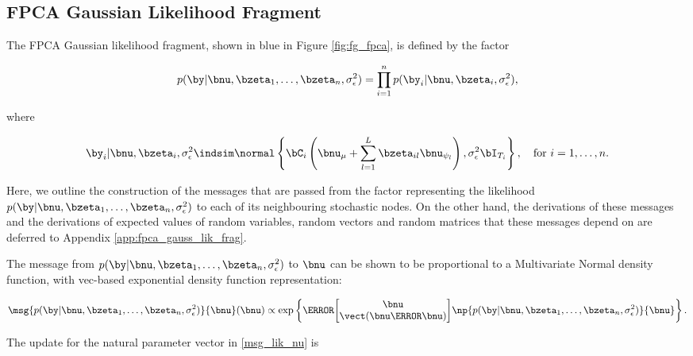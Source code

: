 \documentclass[12pt]{article}
\def\sigsqeps{\sigma^2_{\epsilon}}
\def\numu{\bnu_\mu}
\newcommand\nupsi[1]{\bnu_{\psi_{#1}}}
\theoremstyle{plain}
\theoremstyle{definition}
\theoremstyle{remark}
\begin{document}

\subsection{FPCA Gaussian Likelihood Fragment}
\label{sec:fpca_gauss_lik_frag}

The FPCA Gaussian likelihood fragment, shown in blue in Figure \ref{fig:fg_fpca}, is defined by the factor

\begin{equation}
	p (\by | \bnu, \bzeta_1, \dots, \bzeta_n, \sigsqeps) =
		\prod_{i=1}^n p (\by_i | \bnu, \bzeta_i, \sigsqeps),
\label{fpc_gauss_lik_factorized}
\end{equation}

\noindent where

\begin{equation}
	\by_i | \bnu, \bzeta_i, \sigsqeps \indsim \normal \left\{
		\bC_i \left( \numu + \sum_{l=1}^L \bzeta_{il} \nupsi{l} \right), \sigsqeps \bI_{T_i}
	\right\}, \quad \text{for $i = 1, \dots, n$}.
\label{fpc_gauss_lik_factor}
\end{equation}

\noindent Here, we outline the construction of the messages that are passed from the factor representing
the likelihood $p (\by | \bnu, \bzeta_1, \dots, \bzeta_n, \sigsqeps)$ to each of its neighbouring stochastic nodes.
On the other hand, the
derivations of these messages and the derivations of expected values of random variables, random vectors
and random matrices that these messages depend on are deferred to Appendix \ref{app:fpca_gauss_lik_frag}.

The message from $p (\by | \bnu, \bzeta_1, \dots, \bzeta_n, \sigsqeps)$ to $\bnu$ can be shown to be
proportional to a Multivariate
Normal density function, with vec-based exponential density function representation:

\begin{equation}
	\msg{p (\by | \bnu, \bzeta_1, \dots, \bzeta_n, \sigsqeps)}{\bnu} (\bnu) \propto
		\exp \left\{
			\T{\begin{bmatrix}
				\bnu \\
				\vect (\bnu \T{\bnu})
			\end{bmatrix}}
			\np{p (\by | \bnu, \bzeta_1, \dots, \bzeta_n, \sigsqeps)}{\bnu}
		\right\}.
\label{msg_lik_nu}
\end{equation}

\noindent The update for the natural parameter vector in \eqref{msg_lik_nu} is
\end{document}
